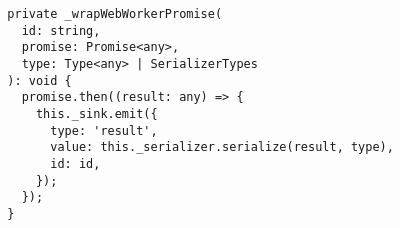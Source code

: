 \begin{verbatim}
  private _wrapWebWorkerPromise(
    id: string,
    promise: Promise<any>,
    type: Type<any> | SerializerTypes
  ): void {
    promise.then((result: any) => {
      this._sink.emit({
        type: 'result',
        value: this._serializer.serialize(result, type),
        id: id,
      });
    });
  }
\end{verbatim}
